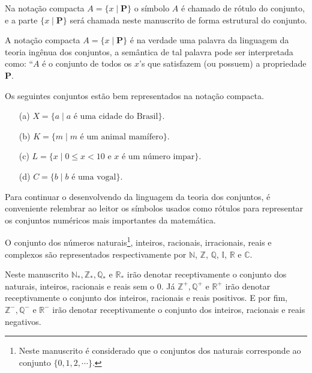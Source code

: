Na notação compacta $A = \{ x \mid \textbf{P}\}$ o símbolo $A$ é chamado de rótulo do conjunto, e a parte $\{ x \mid \textbf{P}\}$ será chamada neste manuscrito de forma estrutural do conjunto.

\begin{remark}
	A notação compacta $A = \{ x \mid \textbf{P}\}$ é na verdade uma palavra da linguagem da teoria ingênua dos conjuntos, a semântica de tal palavra pode ser interpretada como: ``$A$ é o conjunto de todos os $x$'s que satisfazem (ou possuem) a propriedade $\textbf{P}$.
\end{remark}

\begin{example}\label{exe:conjuntos}
	Os seguintes conjuntos estão bem representados na notação compacta.
	\begin{itemize}
		\item[(a)] $X = \{a \mid a \mbox{ é uma cidade do Brasil}\}$.
		\item[(b)] $K = \{m \mid m \mbox{ é um animal mamífero}\}$.
		\item[(c)] $L = \{x \mid 0 \leq x < 10 \mbox{ e } x \mbox{ é um número impar}\}$.
		\item[(d)] $C = \{b \mid b \mbox{ é uma vogal}\}$.
	\end{itemize}
\end{example}

Para continuar o desenvolvendo da linguagem da teoria dos conjuntos, é conveniente relembrar ao leitor os símbolos usados como rótulos para representar os conjuntos numéricos mais importantes da matemática.

\begin{definition}\label{def:SimbolosConjuntos}
	O conjunto dos números naturais\footnote{Neste manuscrito é considerado que o conjuntos dos naturais corresponde ao conjunto $\{0, 1, 2, \cdots\}$.}, inteiros, racionais, irracionais, reais e complexos são representados respectivamente por   $\mathbb{N}$, $\mathbb{Z}$,  $\mathbb{Q}$,  $\mathbb{I}$,  $\mathbb{R}$ e  $\mathbb{C}$.
\end{definition}

\begin{remark}
	Neste manuscrito $\mathbb{N}_*, \mathbb{Z}_*, \mathbb{Q}_*$ e $\mathbb{R}_*$ irão denotar receptivamente o conjunto dos naturais, inteiros, racionais e reais sem o $0$. Já $\mathbb{Z}^+, \mathbb{Q}^+$ e $\mathbb{R}^+$ irão denotar receptivamente o conjunto dos inteiros, racionais e reais positivos. E por fim, $\mathbb{Z}^-, \mathbb{Q}^-$ e $\mathbb{R}^-$ irão denotar receptivamente o conjunto dos inteiros, racionais e reais negativos.
\end{remark}

